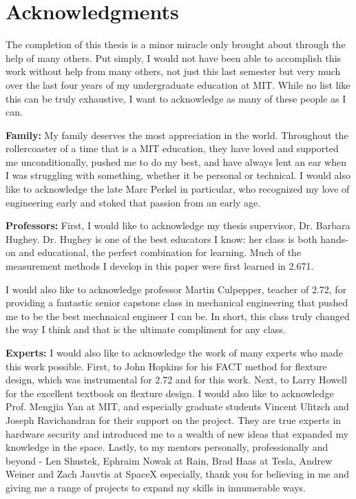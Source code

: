 

\chapter*{Acknowledgments}


The completion of this thesis is a minor miracle only brought about through the help of many others. Put simply, I would not have been able to accomplish this work without help from many others, not just this last semester but very much over the last four years of my undergraduate education at MIT. While no list like this can be truly exhaustive, I want to acknowledge as many of these people as I can.

\textbf{Family: }
My family deserves the most appreciation in the world. Throughout the rollercoaster of a time that is a MIT education, they have loved and supported me unconditionally, pushed me to do my best, and have always lent an ear when I was struggling with something, whether it be personal or technical. I would also like to acknowledge the late Marc Perkel in particular, who recognized my love of engineering early and stoked that passion from an early age.

\textbf{Professors: }
First, I would like to acknowledge my thesis supervisor, Dr. Barbara Hughey. Dr. Hughey is one of the best educators I know: her class is both hands-on and educational, the perfect combination for learning. Much of the measurement methods I develop in this paper were first learned in 2.671.

I would also like to acknowledge professor Martin Culpepper, teacher of 2.72, for providing a fantastic senior capstone class in mechanical engineering that pushed me to be the best mechnaical engineer I can be. In short, this class truly changed the way I think and that is the ultimate compliment for any class.

\textbf{Experts: }
I would also like to acknowledge the work of many experts who made this work possible. First, to John Hopkins for his FACT method for flexture design, which was instrumental for 2.72 and for this work. Next, to Larry Howell for the excellent textbook on flexture design.
I would also like to acknowledge Prof. Mengjia Yan at MIT, and especially graduate students Vincent Ulitzch and Joseph Ravichandran for their support on the project. They are true experts in hardware security and introduced me to a wealth of new ideas that expanded my knowledge in the space.
Lastly, to my mentors personally, professionally and beyond - Len Shustek, Ephraim Nowak at Rain, Brad Haas at Tesla, Andrew Weiner and Zach Jauvtis at SpaceX especially, thank you for believing in me and giving me a range of projects to expand my skills in innumerable ways.

